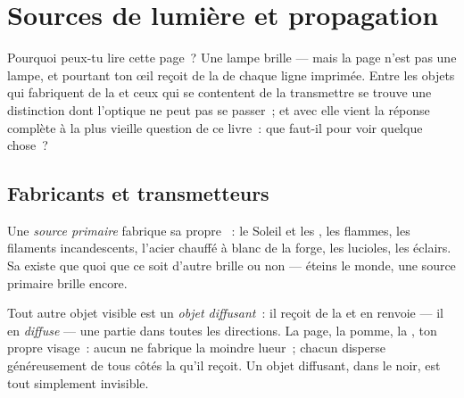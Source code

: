 \chapter{Sources de lumière et propagation}\label{ch:g7:light-sources-propagation}

Pourquoi peux-tu lire cette page~? Une lampe brille --- mais la page
n'est pas une lampe, et pourtant ton œil reçoit de la  de
chaque ligne imprimée. Entre les objets qui fabriquent de la 
et ceux qui se contentent de la transmettre se trouve une distinction
dont l'optique ne peut pas se passer~; et avec elle vient la réponse
complète à la plus vieille question de ce livre~: que faut-il pour
voir quelque chose~?

\section{Fabricants et transmetteurs}

\begin{definition}\label{def:g7:light-sources-propagation:primary}
Une \emph{source primaire} fabrique sa propre
~: le Soleil et les , les flammes, les filaments
incandescents, l'acier chauffé à blanc de la forge, les lucioles, les
éclairs. Sa  existe que quoi que ce soit d'autre brille ou
non --- éteins le monde, une source primaire brille encore.
\end{definition}

\begin{definition}\label{def:g7:light-sources-propagation:diffusion}
Tout autre objet visible est un \emph{objet
diffusant}~: il reçoit de la  et en renvoie
--- il en \emph{diffuse} --- une partie dans toutes les directions.
La page, la pomme, la , ton propre visage~: aucun ne fabrique la
moindre lueur~; chacun disperse généreusement de tous côtés la
 qu'il reçoit. Un objet diffusant, dans le noir, est tout
simplement invisible.
\end{definition}

